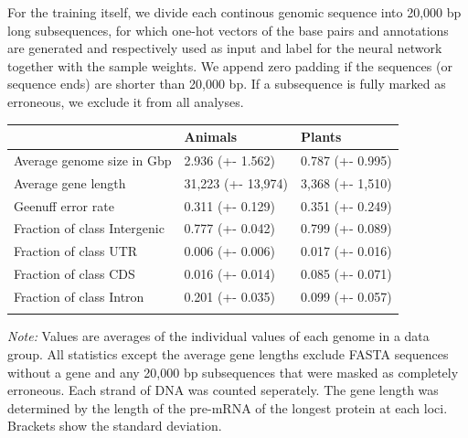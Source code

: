 \documentclass{bioinfo}
\begin{document}
\begin{methods}
For the training itself, we divide each continous genomic sequence into 20,000 bp 
long subsequences, for which one-hot vectors of the base pairs and annotations 
are generated and respectively used as input and label for the neural network 
together with the sample weights. We append zero padding if the sequences (or
sequence ends) are shorter than 20,000 bp. 
If a subsequence is fully marked as erroneous, we exclude it from all analyses. 

\begin{table}[!htb]
 {
\begin{tabular}{@{}lll@{}}
\toprule & Animals & Plants\\
\midrule
Average genome size in Gbp& 2.936 (+- 1.562) & 0.787 (+- 0.995) \\
Average gene length & 31,223 (+- 13,974)& 3,368 (+- 1,510)\\
Geenuff error rate & 0.311 (+- 0.129) & 0.351 (+- 0.249) \\
Fraction of class Intergenic  & 0.777 (+- 0.042) & 0.799 (+- 0.089) \\
Fraction of class UTR & 0.006 (+- 0.006) & 0.017 (+- 0.016) \\
Fraction of class CDS & 0.016 (+- 0.014) & 0.085 (+- 0.071) \\
Fraction of class Intron & 0.201 (+- 0.035) & 0.099 (+- 0.057) \\
\botrule
\end{tabular}}{{\it Note:} Values are averages of the individual values of each 
genome in a data group. All statistics except the average gene lengths exclude
FASTA sequences without a gene and any 20,000 bp subsequences that were masked as completely 
erroneous. Each strand of DNA was counted seperately. The gene length was 
determined by the length of the pre-mRNA of the longest protein at each
loci. Brackets show the standard deviation.}
\end{table}



\end{methods}
\end{document}
